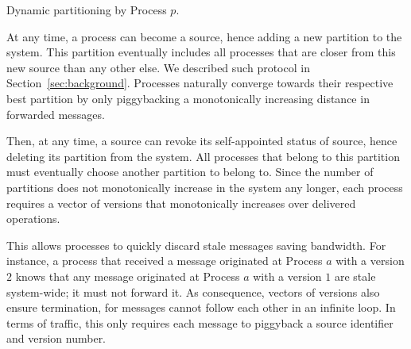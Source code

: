 \begin{algorithm}
  
  \caption{\label{algo:adddelundo}Dynamic partitioning by Process $p$.}
\end{algorithm}

At any time, a process can become a source, hence adding a new
partition to the system. This partition eventually includes all
processes that are closer from this new source than any other else. We
described such protocol in Section~\ref{sec:background}. Processes
naturally converge towards their respective best partition by only
piggybacking a monotonically increasing distance in forwarded
messages. %

Then, at any time, a source can revoke its self-appointed status of
source, hence deleting its partition from the system. All processes
that belong to this partition must eventually choose another partition
to belong to. Since the number of partitions does not monotonically
increase in the system any longer, each process requires a vector of
versions that monotonically increases over delivered operations.

This allows processes to quickly discard stale messages saving
bandwidth. For instance, a process that received a message originated
at Process $a$ with a version $2$ knows that any message originated at
Process $a$ with a version $1$ are stale system-wide; it must not
forward it. As consequence, vectors of versions also ensure
termination, for messages  cannot follow each other
in an infinite loop. In terms of traffic, this only requires each
 message to piggyback a source identifier and version
number.


